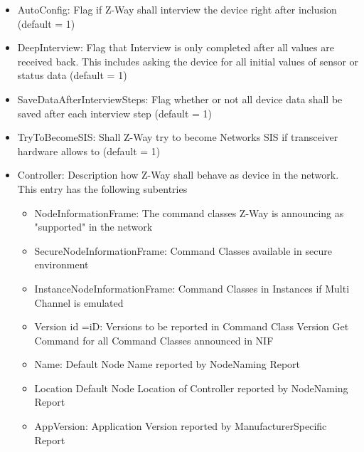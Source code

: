 \begin{itemize}
\item AutoConfig: Flag if Z-Way shall interview the device right after inclusion (default = 1)
\item DeepInterview: Flag that Interview is only completed after all values are received back. This includes
asking the device for all initial values of sensor or status data (default = 1)
\item SaveDataAfterInterviewSteps: Flag whether or not all device data shall be saved after each interview step (default = 1)
\item TryToBecomeSIS: Shall Z-Way try to become Networks SIS if transceiver hardware allows to (default = 1)
\item Controller: Description how Z-Way shall behave as device in the network. This entry has the following subentries
\begin{itemize}
\item NodeInformationFrame: The command classes Z-Way is announcing as "supported" in the network
\item SecureNodeInformationFrame: Command Classes available in secure environment
\item InstanceNodeInformationFrame: Command Classes in Instances if Multi Channel is emulated
\item Version id =iD: Versions to be reported in Command Class Version Get Command for all Command Classes announced in NIF
\item Name: Default Node Name reported by NodeNaming Report
\item Location Default Node Location of Controller reported by NodeNaming Report
\item AppVersion: Application Version reported by ManufacturerSpecific Report 


\end{itemize}
\end{itemize}

